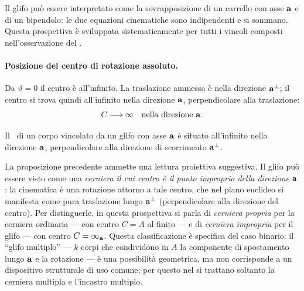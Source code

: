 \begin{oss}
	Il glifo può essere interpretato come la sovrapposizione
	di un carrello con asse $\mathbf{a}$ e di un bipendolo: le due
	equazioni cinematiche sono indipendenti e si sommano.
	Questa prospettiva è sviluppata sistematicamente per
	tutti i vincoli composti nell'osservazione del
	.
\end{oss}

\paragraph{Posizione del centro di rotazione assoluto.}
Da $\vartheta = 0$ il centro è all'infinito. La traslazione
ammessa è nella direzione $\mathbf{a}^{\perp}$; il centro si trova
quindi all'infinito nella direzione $\mathbf{a}$, perpendicolare
alla traslazione:
\begin{equation}\label{eq:CR_glifo}
	C \longrightarrow \infty
	\quad \text{nella direzione } \mathbf{a}.
\end{equation}

\begin{proposizione}
	Il \CRa\ di un corpo vincolato da un glifo con asse $\mathbf{a}$
	è situato all'infinito nella direzione $\mathbf{a}$,
	perpendicolare alla direzione di scorrimento $\mathbf{a}^{\perp}$.
\end{proposizione}


\begin{oss}
	La proposizione precedente ammette una lettura proiettiva
	suggestiva. Il glifo può essere visto come una
	\emph{cerniera il cui centro è il punto improprio della
		direzione} $\mathbf{a}$: la cinematica è una rotazione attorno
	a tale centro, che nel piano euclideo si manifesta come
	pura traslazione lungo $\mathbf{a}^{\perp}$ (perpendicolare alla
	direzione del centro). Per distinguerle, in questa
	prospettiva si parla di \emph{cerniera propria} per la
	cerniera ordinaria — con centro $C = A$ al finito — e di
	\emph{cerniera impropria} per il glifo — con centro
	$C = \infty_{\mathbf{a}}$. Questa classificazione è specifica del
	caso binario: il ``glifo multiplo'' — $k$ corpi che condividono
	in $A$ la componente di spostamento lungo $\mathbf{a}$ e la
	rotazione — è una possibilità geometrica, ma non
	corrisponde a un dispositivo strutturale di uso comune;
	per questo nel  si trattano
	soltanto la cerniera multipla e l'incastro multiplo.
\end{oss}


